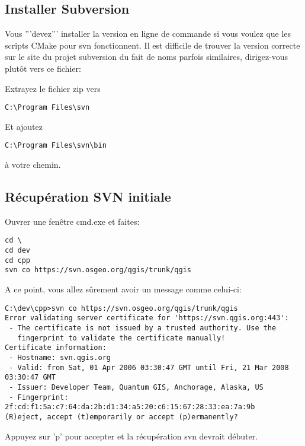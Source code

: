 \subsection{Installer Subversion}
Vous '''devez''' installer la version en ligne de commande si vous voulez que les scripts CMake pour svn fonctionnent. Il est difficile de trouver la version correcte sur le site du projet subversion du fait de noms parfois similaires, dirigez-vous plut\^ot vers ce fichier:


Extrayez le fichier zip vers
\begin{verbatim}
C:\Program Files\svn
\end{verbatim}

Et ajoutez

\begin{verbatim}
C:\Program Files\svn\bin
\end{verbatim}

\`a votre chemin.

\subsection{R\'ecup\'eration SVN initiale}
Ouvrer une fen\^etre cmd.exe et faites:

\begin{verbatim}
cd \
cd dev
cd cpp
svn co https://svn.osgeo.org/qgis/trunk/qgis 
\end{verbatim}

A ce point, vous allez s\^urement avoir un message comme celui-ci:

\begin{verbatim}
C:\dev\cpp>svn co https://svn.osgeo.org/qgis/trunk/qgis
Error validating server certificate for 'https://svn.qgis.org:443':
 - The certificate is not issued by a trusted authority. Use the
   fingerprint to validate the certificate manually!
Certificate information:
 - Hostname: svn.qgis.org
 - Valid: from Sat, 01 Apr 2006 03:30:47 GMT until Fri, 21 Mar 2008 03:30:47 GMT
 - Issuer: Developer Team, Quantum GIS, Anchorage, Alaska, US
 - Fingerprint: 2f:cd:f1:5a:c7:64:da:2b:d1:34:a5:20:c6:15:67:28:33:ea:7a:9b
(R)eject, accept (t)emporarily or accept (p)ermanently?
\end{verbatim}

Appuyez sur 'p' pour accepter et la r\'ecup\'eration svn devrait d\'ebuter.

